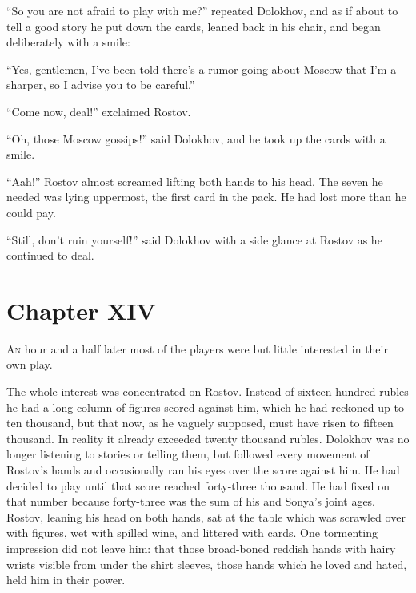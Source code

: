 ``So you are not afraid to play with me?'' repeated Dolokhov, and
as if about to tell a good story he put down the cards, leaned
back in his chair, and began deliberately with a smile:

``Yes, gentlemen, I've been told there's a rumor going about
Moscow that I'm a sharper, so I advise you to be careful.''

``Come now, deal!'' exclaimed Rostov.

``Oh, those Moscow gossips!'' said Dolokhov, and he took up the
cards with a smile.

``Aah!'' Rostov almost screamed lifting both hands to his
head. The seven he needed was lying uppermost, the first card in
the pack. He had lost more than he could pay.

``Still, don't ruin yourself!'' said Dolokhov with a side glance
at Rostov as he continued to deal.


\chapter*{Chapter XIV}
\ifaudio     
{} 
\fi

\lettrine[lines=2, loversize=0.3, lraise=0]{\initfamily A}{n}
hour and a half later most of the players were but little
interested in their own play.

The whole interest was concentrated on Rostov. Instead of sixteen
hundred rubles he had a long column of figures scored against
him, which he had reckoned up to ten thousand, but that now, as
he vaguely supposed, must have risen to fifteen thousand. In
reality it already exceeded twenty thousand rubles. Dolokhov was
no longer listening to stories or telling them, but followed
every movement of Rostov's hands and occasionally ran his eyes
over the score against him. He had decided to play until that
score reached forty-three thousand. He had fixed on that number
because forty-three was the sum of his and Sonya's joint
ages. Rostov, leaning his head on both hands, sat at the table
which was scrawled over with figures, wet with spilled wine, and
littered with cards. One tormenting impression did not leave him:
that those broad-boned reddish hands with hairy wrists visible
from under the shirt sleeves, those hands which he loved and
hated, held him in their power.

